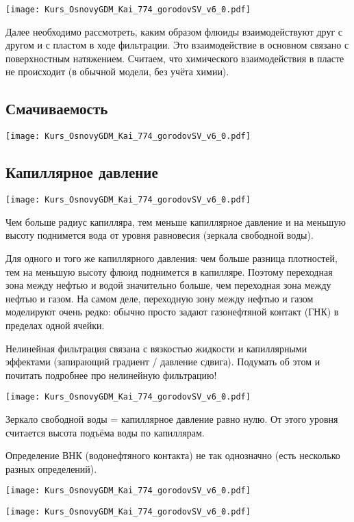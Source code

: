 \documentclass[main.tex]{subfiles}
\begin{document}
\texttt{[image: Kurs\_OsnovyGDM\_Kai\_774\_gorodovSV\_v6\_0.pdf]}

Далее необходимо рассмотреть, каким образом флюиды взаимодействуют друг с другом и с пластом в ходе фильтрации. Это взаимодействие в основном связано с поверхностным натяжением. Считаем, что химического взаимодействия в пласте не происходит (в обычной модели, без учёта химии).

\subsection{Смачиваемость}

\texttt{[image: Kurs\_OsnovyGDM\_Kai\_774\_gorodovSV\_v6\_0.pdf]}

\subsection{Капиллярное давление}

\texttt{[image: Kurs\_OsnovyGDM\_Kai\_774\_gorodovSV\_v6\_0.pdf]}

Чем больше радиус капилляра, тем меньше капиллярное давление и на меньшую высоту поднимется вода от уровня равновесия (зеркала свободной воды).

Для одного и того же капиллярного давления: чем больше разница плотностей, тем на меньшую высоту флюид поднимется в капилляре.
Поэтому переходная зона между нефтью и водой значительно больше, чем переходная зона между нефтью и газом.
На самом деле, переходную зону между нефтью и газом моделируют очень редко: обычно просто задают газонефтяной контакт (ГНК) в пределах одной ячейки.

Нелинейная фильтрация связана с вязкостью жидкости и капиллярными эффектами (запирающий градиент / давление сдвига). Подумать об этом и почитать подробнее про нелинейную фильтрацию!

\texttt{[image: Kurs\_OsnovyGDM\_Kai\_774\_gorodovSV\_v6\_0.pdf]}

Зеркало свободной воды = капиллярное давление равно нулю.
От этого уровня считается высота подъёма воды по капиллярам.

Определение ВНК (водонефтяного контакта) не так однозначно (есть несколько разных определений).

\texttt{[image: Kurs\_OsnovyGDM\_Kai\_774\_gorodovSV\_v6\_0.pdf]}

\texttt{[image: Kurs\_OsnovyGDM\_Kai\_774\_gorodovSV\_v6\_0.pdf]}
\end{document}

